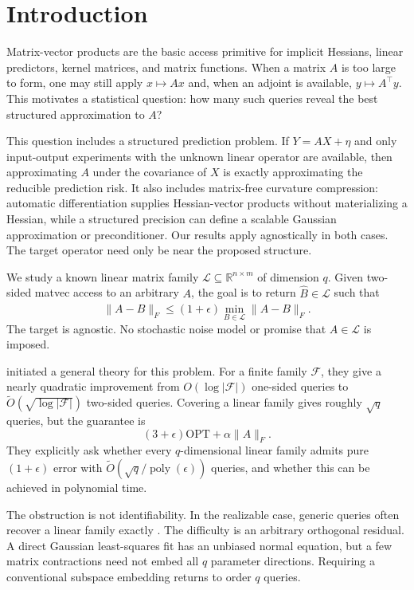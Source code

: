 \documentclass[twoside]{article}
\newcommand{\R}{\mathbb R}
\newcommand{\cL}{\mathcal L}
\newcommand{\OPT}{\mathrm{OPT}}
\begin{document}
\section{Introduction}

Matrix-vector products are the basic access primitive for implicit Hessians, linear predictors, kernel matrices, and matrix functions. When a matrix $A$ is too large to form, one may still apply $x\mapsto Ax$ and, when an adjoint is available, $y\mapsto A^\top y$. This motivates a statistical question: how many such queries reveal the best structured approximation to $A$?

This question includes a structured prediction problem. If $Y=AX+\eta$ and only input-output experiments with the unknown linear operator are available, then approximating $A$ under the covariance of $X$ is exactly approximating the reducible prediction risk. It also includes matrix-free curvature compression: automatic differentiation supplies Hessian-vector products without materializing a Hessian, while a structured precision can define a scalable Gaussian approximation or preconditioner. Our results apply agnostically in both cases. The target operator need only be near the proposed structure.

We study a known linear matrix family $\cL\subseteq\R^{n\times m}$ of dimension $q$. Given two-sided matvec access to an arbitrary $A$, the goal is to return $\widehat B\in\cL$ such that
\begin{equation}
 \|A-\widehat B\|_F
 \le (1+\epsilon)\min_{B\in\cL}\|A-B\|_F.
 \label{eq:goal}
\end{equation}
The target is agnostic. No stochastic noise model or promise that $A\in\cL$ is imposed.

\citet{amsel2026query} initiated a general theory for this problem. For a finite family $\mathcal F$, they give a nearly quadratic improvement from $O(\log|\mathcal F|)$ one-sided queries to $\widetilde O(\sqrt{\log|\mathcal F|})$ two-sided queries. Covering a linear family gives roughly $\sqrt q$ queries, but the guarantee is
\begin{equation}
 (3+\epsilon)\OPT+\alpha\|A\|_F.
 \label{eq:prior}
\end{equation}
They explicitly ask whether every $q$-dimensional linear family admits pure $(1+\epsilon)$ error with $\widetilde O(\sqrt q/\operatorname{poly}(\epsilon))$ queries, and whether this can be achieved in polynomial time.

The obstruction is not identifiability. In the realizable case, generic queries often recover a linear family exactly \citep{halikias2024structured}. The difficulty is an arbitrary orthogonal residual. A direct Gaussian least-squares fit has an unbiased normal equation, but a few matrix contractions need not embed all $q$ parameter directions. Requiring a conventional subspace embedding returns to order $q$ queries.
\end{document}
